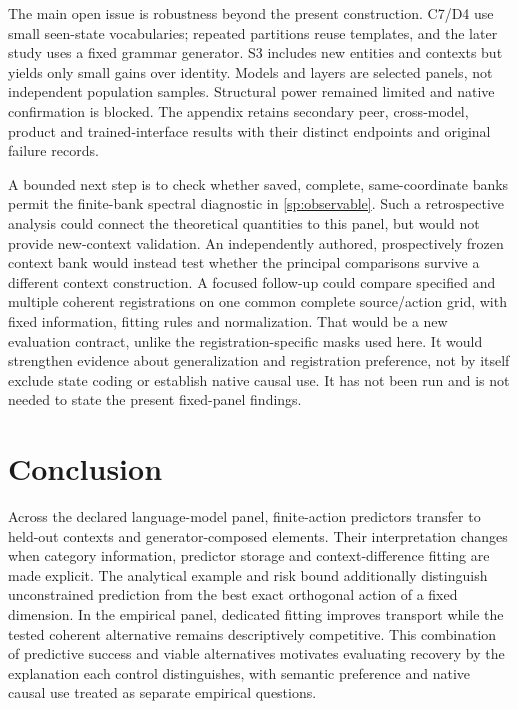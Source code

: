 \documentclass{article}
\begin{document}
The main open issue is robustness beyond the present construction. C7/D4 use small seen-state vocabularies; repeated partitions reuse templates, and the later study uses a fixed grammar generator. S3 includes new entities and contexts but yields only small gains over identity. Models and layers are selected panels, not independent population samples. Structural power remained limited and native confirmation is blocked. The appendix retains secondary peer, cross-model, product and trained-interface results with their distinct endpoints and original failure records.

A bounded next step is to check whether saved, complete, same-coordinate banks permit the finite-bank spectral diagnostic in \cref{sp:observable}. Such a retrospective analysis could connect the theoretical quantities to this panel, but would not provide new-context validation. An independently authored, prospectively frozen context bank would instead test whether the principal comparisons survive a different context construction. A focused follow-up could compare specified and multiple coherent registrations on one common complete source/action grid, with fixed information, fitting rules and normalization. That would be a new evaluation contract, unlike the registration-specific masks used here. It would strengthen evidence about generalization and registration preference, not by itself exclude state coding or establish native causal use. It has not been run and is not needed to state the present fixed-panel findings.

\section{Conclusion}
Across the declared language-model panel, finite-action predictors transfer to held-out contexts and generator-composed elements. Their interpretation changes when category information, predictor storage and context-difference fitting are made explicit. The analytical example and risk bound additionally distinguish unconstrained prediction from the best exact orthogonal action of a fixed dimension. In the empirical panel, dedicated fitting improves transport while the tested coherent alternative remains descriptively competitive. This combination of predictive success and viable alternatives motivates evaluating recovery by the explanation each control distinguishes, with semantic preference and native causal use treated as separate empirical questions.

\FloatBarrier
\label{sec:main-end}
\end{document}
